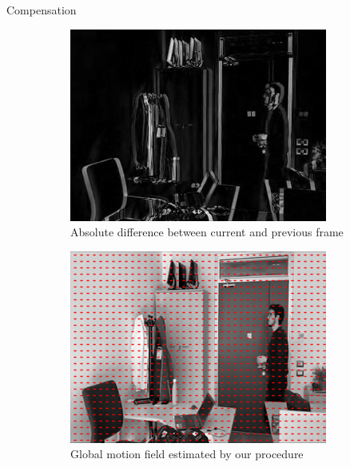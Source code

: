 \documentclass[aspectratio=1610,xcolor=dvipsnames]{beamer}
\begin{document}
\begin{frame}{Compensation}
\begin{figure}[htbp]
        \begin{subfigure}[b]{0.3\textwidth}
            \centering
            \includegraphics[width=.9\textwidth]{../assets/images/04-diff-curr-prev-1.png}
            \caption{Absolute difference between current and previous frame}
            \label{fig:diff-curr-prev}
        \end{subfigure}
        \hfill
        \begin{subfigure}[b]{0.3\textwidth}
            \includegraphics[width=.9\textwidth]{../assets//images/04-camera-motion-1.png}
            \caption{Global motion field estimated by our procedure}
            \label{fig:est-mf}
        \end{subfigure}
        \hfill
        \begin{subfigure}[b]{0.3\textwidth}

\end{subfigure}
\end{figure}
\end{frame}
\end{document}
